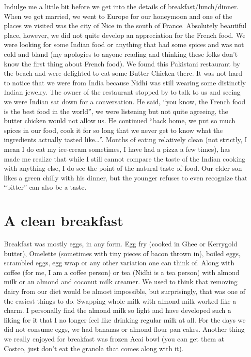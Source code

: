 \documentclass[
  oneside]{book}
\begin{document}
Indulge me a little bit before we get into the details of breakfast/lunch/dinner. When we got married, we went to Europe for our honeymoon and one of the places we visited was the city of Nice in the south of France. Absolutely beautiful place, however, we did not quite develop an appreciation for the French food. We were looking for some Indian food or anything that had some spices and was not cold and bland (my apologies to anyone reading and thinking these folks don't know the first thing about French food). We found this Pakistani restaurant by the beach and were delighted to eat some Butter Chicken there. It was not hard to notice that we were from India because Nidhi was still wearing some distinctly Indian jewelry. The owner of the restaurant stopped by to talk to us and seeing we were Indian sat down for a conversation. He said, ``you know, the French food is the best food in the world'', we were listening but not quite agreeing, the butter chicken would not allow us. He continued ``back home, we put so much spices in our food, cook it for so long that we never get to know what the ingredients actually tasted like\ldots{}''. Months of eating relatively clean (not strictly, I mean I do eat my ice-cream sometimes, I have had a pizza a few times), has made me realize that while I still cannot compare the taste of the Indian cooking with anything else, I do see the point of the natural taste of food. Our elder son likes a green chilly with his dinner, but the younger refuses to even recognize that ``bitter'' can also be a taste.

\hypertarget{a-clean-breakfast}{%
\section{A clean breakfast}\label{a-clean-breakfast}}

Breakfast was mostly eggs, in any form. Egg fry (cooked in Ghee or Kerrygold butter), Omelette (sometimes with tiny pieces of bacon thrown in), boiled eggs, scrambled eggs, egg wrap or any other variation one can think of. Along with coffee (for me, I am a coffee person) or tea (Nidhi is a tea person) with almond milk or an almond and coconut milk creamer. We used to think that removing dairy from our diet would be almost impossible, but surprisingly, that was one of the easiest things to do. Swapping whole milk with almond milk worked like a charm. I personally find the almond milk so light and have developed such a liking for it that I no longer feel like drinking regular milk at all. For the days we did not consume eggs, we had bananas or almond flour pan cakes. Another thing we really enjoyed for breakfast was frozen Acai bowl (you can get them at Costco, just don't eat the granola that comes along with it).
\end{document}
